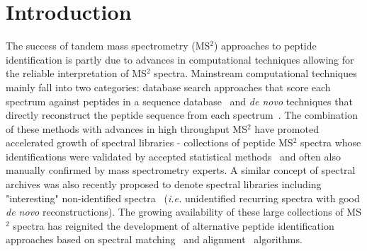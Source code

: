 \documentclass[8.5pt,twoside,twocolumn]{article}
\begin{document}
\section{Introduction}


The success of tandem mass spectrometry (MS$^2$) approaches to peptide identification is partly due to advances
in computational techniques allowing for the reliable interpretation of MS$^2$ spectra. Mainstream computational techniques mainly fall into two categories: database search approaches that score each spectrum against peptides in a sequence database~\cite{eng94,perkins99,craig04,tanner05} and {\em de novo} techniques that directly reconstruct the peptide sequence from each spectrum~\cite{ma03,frank05,fischer05,mo07}. The combination of these methods with advances in high throughput MS$^2$ have promoted accelerated growth of spectral libraries - collections of peptide
MS$^2$ spectra whose identifications were validated by accepted statistical methods~\cite{keller02,elias07} and often also
manually confirmed by mass spectrometry experts. A similar concept of spectral archives was also recently
proposed to denote spectral libraries including "interesting" non-identified spectra~\cite{frank08} ({\em i.e.} unidentified recurring
spectra with good {\em de novo} reconstructions). The growing availability of these large
collections of MS$^2$ spectra has reignited the development of alternative peptide identification approaches
based on spectral matching~\cite{craig06,frewen06,lam07} and alignment~\cite{bandeira04,savitski06,bandeira07pnas} algorithms.
\end{document}

